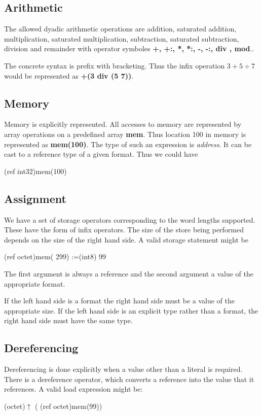 {{\subsection{Arithmetic}
The allowed dyadic arithmetic operations are addition, saturated addition, multiplication,
saturated multiplication,
subtraction, saturated subtraction,
division and remainder with operator symboles {\bf +, +:, *, *:, -, -:, div , mod}.. 
 

The concrete syntax is prefix with bracketing. Thus 
the infix operation $ 3+5 \div 7$ would be
represented as {\bf +(3 div (5 7))}.
\subsection{Memory}
Memory is explicitly represented. All accesses to memory are
represented by array operations on a predefined array {\bf mem}.
Thus location 100 in memory is represented as {\bf mem(100)}.
The type of such an expression is {\sl address}.
It can be cast to a reference type of a given format.
Thus we could have
{\bf

(ref int32)mem(100)
}

\subsection{ Assignment }
We have a set of storage  operators corresponding to the
word lengths supported. These  have the form of 
infix operators. The size of the store being performed
depends on the size of the right hand side.
A valid storage statement might be 
{\bf

(ref octet)mem( 299) :=(int8) 99

}
The first argument is always a reference and the second 
argument a value of the appropriate format.

If the left hand side is a format the right hand side
must be a value of the appropriate size.
If the left hand side is an explicit type rather than
a format, the right hand side must have the same type.
\subsection{ Dereferencing}
Dereferencing is done explicitly when a value other than a literal is required.
There is a dereference operator, which converts a reference 
into the value that it references.
 A valid load expression might be:
{\bf

(octet)$\uparrow$  ( (ref octet)mem(99))

}}}
